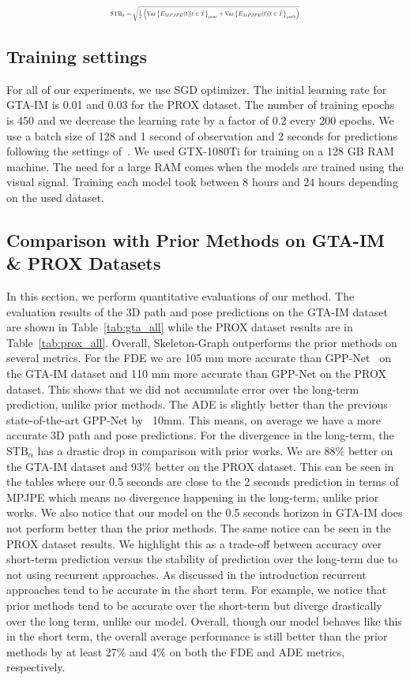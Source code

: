 \documentclass[10pt,twocolumn,letterpaper]{article}
\newcommand*{\ours}{Skeleton-Graph }
\begin{document}
\begin{equation}
\label{eq:spread}
\resizebox{0.5\textwidth}{!}{$\text{STB}_{\sigma}=\sqrt{\frac{1}{2}\left(\text{Var}\left\{ E_{M P J P E}(t)| t\in\tilde{T}\right\}_\text{pose} +\text{Var}\left\{ E_{M P J P E}(t)|t\in \tilde{T} \right\}_\text{path}\right)} $}
\end{equation}

\subsection{Training settings}
For all of our experiments, we use SGD optimizer. The initial learning rate for GTA-IM is 0.01 and 0.03 for the PROX dataset. The number of training epochs is 450 and we decrease the learning rate by a factor of 0.2 every 200 epochs. We use a batch size of 128 and 1 second of observation and 2 seconds for predictions following the settings of~\cite{cao2020long}. We used GTX-1080Ti for training on a 128 GB RAM machine. The need for a large RAM comes when the models are trained using the visual signal. Training each model took between 8 hours and 24 hours depending on the used dataset.
\subsection{Comparison with Prior Methods on GTA-IM \& PROX Datasets}
In this section, we perform quantitative evaluations of our method. The evaluation results of the 3D path and pose predictions on the GTA-IM dataset are shown in Table~\ref{tab:gta_all} while the PROX dataset results are in Table~\ref{tab:prox_all}. Overall, \ours outperforms the prior methods on several metrics. For the FDE we are 105 mm more accurate than GPP-Net~\cite{cao2020long} on the GTA-IM dataset and 110 mm more accurate than GPP-Net on the PROX dataset. This shows that we did not accumulate error over the long-term prediction, unlike prior methods. The ADE is slightly better than the previous state-of-the-art GPP-Net by ~10mm. This means, on average we have a more accurate 3D path and pose predictions. For the divergence in the long-term, the $\text{STB}_\alpha$ has a drastic drop in comparison with prior works. We are 88\% better on the GTA-IM dataset and 93\% better on the PROX dataset. This can be seen in the tables where our 0.5 seconds are close to the 2 seconds prediction in terms of MPJPE which means no divergence happening in the long-term, unlike prior works. We also notice that our model on the 0.5 seconds horizon in GTA-IM does not perform better than the prior methods. The same notice can be seen in the PROX dataset results. We highlight this as a trade-off between accuracy over short-term prediction versus the stability of prediction over the long-term due to not using recurrent approaches. As discussed in the introduction recurrent approaches tend to be accurate in the short term. For example, we notice that prior methods tend to be accurate over the short-term but diverge drastically over the long term, unlike our model. Overall, though our model behaves like this in the short term, the overall average performance is still better than the prior methods by at least 27\% and 4\% on both the FDE and ADE metrics, respectively.
\end{document}
